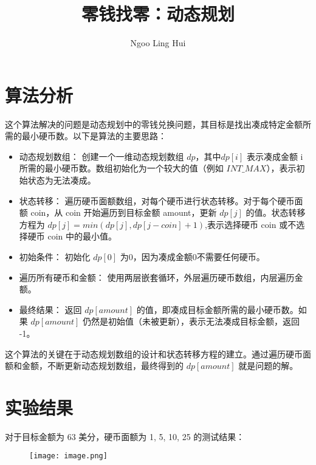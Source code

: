 \documentclass{article}
\title{零钱找零：动态规划}
\author{Ngoo Ling Hui}
\begin{document}
\begin{CJK*}{UTF8}{gbsn}
\maketitle

\section{算法分析}
这个算法解决的问题是动态规划中的零钱兑换问题，其目标是找出凑成特定金额所需的最小硬币数。以下是算法的主要思路：

\begin{itemize}
    \item 动态规划数组： 创建一个一维动态规划数组 $dp$，其中$dp[i]$ 表示凑成金额 i 所需的最小硬币数。数组初始化为一个较大的值（例如 $INT\_MAX$），表示初始状态为无法凑成。
    \item 状态转移： 遍历硬币面额数组，对每个硬币进行状态转移。对于每个硬币面额 coin，从 coin 开始遍历到目标金额 amount，更新 $dp[j]$ 的值。状态转移方程为 $dp[j] = min(dp[j], dp[j - coin] + 1)$,表示选择硬币 coin 或不选择硬币 coin 中的最小值。
    \item 初始条件： 初始化 $dp[0]$ 为0，因为凑成金额0不需要任何硬币。
    \item 遍历所有硬币和金额： 使用两层嵌套循环，外层遍历硬币数组，内层遍历金额。
    \item 最终结果： 返回 $dp[amount]$ 的值，即凑成目标金额所需的最小硬币数。如果 $dp[amount]$ 仍然是初始值（未被更新），表示无法凑成目标金额，返回 -1。
\end{itemize}

这个算法的关键在于动态规划数组的设计和状态转移方程的建立。通过遍历硬币面额和金额，不断更新动态规划数组，最终得到的 $dp[amount]$ 就是问题的解。

\section{实验结果}
对于目标金额为 63 美分，硬币面额为 {1, 5, 10, 25} 的测试结果：
\begin{figure}
\texttt{[image: image.png]}
\end{figure}

\end{CJK*}
\end{document}
